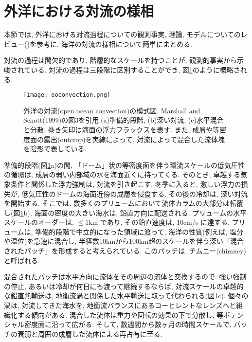 \section{外洋における対流の様相}%
本節では, 
外洋における対流過程についての観測事実, 理論, モデルについてのレビュー(\cite{marshall1999open})を参考に, 
海洋の対流の様相について簡単にまとめる. 

対流の過程は間欠的であり, 階層的なスケールを持つことが,
観測的事実から示唆されている.
対流の過程は三段階に区別することができ,
図\ref{fig:ooconvection_phase}のように概略される. 
\begin{figure}
 \texttt{[image: ooconvection.png]}
 \caption{外洋の対流(open ocean convection)の模式図. Marshall and Schott(1999)の図3を引用.(a)準備的段階, (b)深い対流, (c)水平混合と分散.
 巻き矢印は海面の浮力フラックスを表す.
 また, 成層や等密度面の露出(outcrop)を実線によって.
 対流によって混合した流体塊を陰影で表している.}
 \label{fig:ooconvection_phase}
\end{figure}
準備的段階(図\ref{fig:ooconvection_phase}a)の間,
「ドーム」状の等密度面を伴う環流スケールの低気圧性の循環は,
成層の弱い内部域の水を海面近くに持ってくる.
そのとき, 卓越する気象条件と関係した浮力強制は, 対流を引き起こす.
冬季に入ると, 激しい浮力の損失が, 低気圧性のドームの海面近傍の成層を侵食する.
その後の冷却は, 深い対流を開始する.
そこでは, 数多くのプリュームにおいて流体カラムの大部分は転覆し(図\ref{fig:ooconvection_phase}b),
海面の密度の大きい海水は, 鉛直方向に配送される. 
プリュームの水平スケールのオーダーは, $\le 1$km であり,
その鉛直速度は, 10cm/s に達する. 
プリュームは, 準備的段階で中立的になった領域に渡って,
海洋の性質(例えば, 塩分や温位)を急速に混合し,
半径数10kmから100km超のスケールを伴う深い「混合されたパッチ」を形成すると考えられている.
このパッチは, チムニー(chimney)と呼ばれる.

混合されたパッチは水平方向に流体をその周辺の流体と交換するので. 
強い強制の停止, あるいは冷却が何日にも渡って継続するならば, 
対流スケールの卓越的な鉛直熱輸送は, 地衡流渦と関係した水平輸送に取って代わられる(図\ref{fig:ooconvection_phase}c).
個々の渦は, 対流してきた海水を, 地衡流バランスにあるコーヒレントなレンズへと組織化する傾向がある.
混合した流体は重力や回転の効果の下で分散し, 等ポテンシャル密度面に沿って広がる.
そして, 数週間から数ヶ月の時間スケールで, パッチの衰弱と周囲の成層した流体による再占有に至る. 